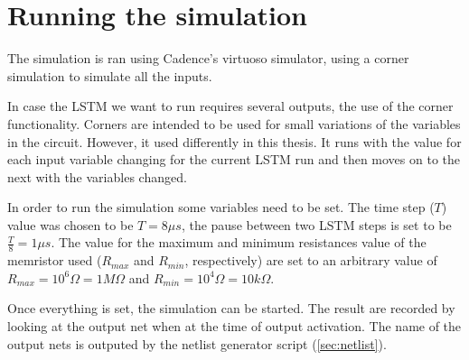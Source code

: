 \section{Running the simulation}\label{sec:run}

The simulation is ran using Cadence's virtuoso simulator, using a corner simulation to simulate all the inputs.

In case the \ac{LSTM} we want to run requires several outputs, the use of the corner functionality. Corners are intended to be used for small variations of the variables in the circuit. However, it used differently in this thesis. It runs with the value for each input variable changing for the current \ac{LSTM} run and then moves on to the next with the variables changed.

In order to run the simulation some variables need to be set. The time step ($T$) value was chosen to be $T=8\mu s$, the pause between two \ac{LSTM} steps is set to be $\frac{T}{8}=1\mu s$. The value for the maximum and minimum resistances value of the memristor used ($R_{max}$ and $R_{min}$, respectively) are set to an arbitrary value of $R_{max}=10^6 \Omega=1M\Omega$ and $R_{min}=10^4 \Omega = 10k\Omega$.

Once everything is set, the simulation can be started. The result are recorded by looking at the output net when at the time of output activation. The name of the output nets is outputed by the netlist generator script (\cref{sec:netlist}).
